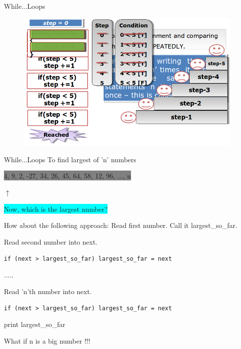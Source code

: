 \documentclass[14pt]{beamer}
\begin{document}
\begin{frame}{While...Loops}
\begin{figure}[H]
\begin{center}
\includegraphics[scale=.4]{while-loop-smiley.png}
\end{center}
\end{figure}
\end{frame}

\begin{frame}{While...Loops}
 To find largest of 'n' numbers
 

 \begin{minipage}{5cm}
  \colorbox{gray}{4, 9, 2, -27, 34, 26, 45, 64, 58, 12, 96, ..., n}
 \end{minipage}
 
\hspace{5cm}$\uparrow$

\hspace{1cm}\begin{minipage}{5cm}
  \colorbox{cyan}{Now, which is the largest number?}
 \end{minipage}
 \begin{block}{How about the following approach:}
 \small
Read first number. Call it largest\_so\_far. 

Read second number into next.

\lstinline!if (next > largest_so_far) largest_so_far = next!

.....

Read 'n'th number into next.

\lstinline!if (next > largest_so_far) largest_so_far = next!

    print largest\_so\_far

 \end{block}
What if n is a big number !!!
\end{frame}
\end{document}
